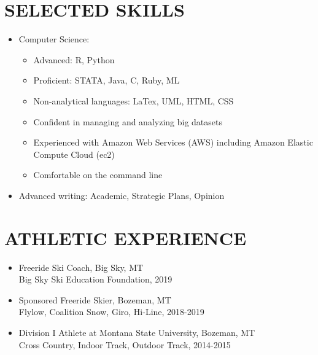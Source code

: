 \documentclass[11pt]{article}
\begin{document}
\section*{SELECTED SKILLS}
\begin{itemize}[left=0pt]
    \item Computer Science:
    \begin{itemize}
        \item Advanced: R, Python
        \item Proficient: STATA, Java, C, Ruby, ML
        \item Non-analytical languages: LaTex, UML, HTML, CSS
        \item Confident in managing and analyzing big datasets
        \item Experienced with Amazon Web Services (AWS) including Amazon Elastic Compute Cloud (ec2)
        \item Comfortable on the command line
    \end{itemize}
    \item Advanced writing: Academic, Strategic Plans, Opinion
\end{itemize}

\section*{ATHLETIC EXPERIENCE}
\begin{itemize}[left=0pt]
    \item Freeride Ski Coach, Big Sky, MT \\
    Big Sky Ski Education Foundation, 2019
    \item Sponsored Freeride Skier, Bozeman, MT \\
    Flylow, Coalition Snow, Giro, Hi-Line, 2018-2019
    \item Division I Athlete at Montana State University, Bozeman, MT \\
    Cross Country, Indoor Track, Outdoor Track, 2014-2015
\end{itemize}
\end{document}
